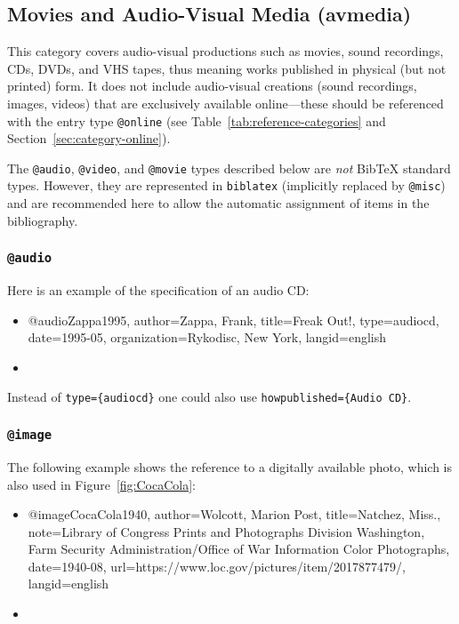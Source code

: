 \subsection{Movies and Audio-Visual Media (\textsf{avmedia})}
\label{sec:category-avmedia}

This category covers audio-visual productions such as movies, sound recordings,
CDs, DVDs, and VHS tapes, thus meaning works published in physical (but not
printed) form. It does not include audio-visual creations (sound recordings,
images, videos) that are exclusively available online---these should be
referenced with the entry type \texttt{@online} (see
Table~\ref{tab:reference-categories} and Section~\ref{sec:category-online}).

The \texttt{@audio}, \texttt{@video}, and \texttt{@movie} types described below
are \emph{not} BibTeX standard types. However, they are represented in
\texttt{biblatex} (implicitly replaced by \texttt{@misc}) and are recommended
here to allow the automatic assignment of items in the bibliography.

\subsubsection{\texttt{\bfseries @audio}}
\label{sec:@audio}
Here is an example of the specification of an audio CD:
%
\begin{itemize}
\item[]
\begin{GenericCode}[numbers=none]
@audio{Zappa1995,
  author={Zappa, Frank},
  title={Freak Out!},
  type={audiocd},
  date={1995-05},
  organization={Rykodisc, New York},
  langid={english}
}
\end{GenericCode}
\item[\cite{Zappa1995}] 
\end{itemize}
%
Instead of \verb!type={audiocd}! one could also use \verb!howpublished={Audio CD}!.

\subsubsection{\texttt{\bfseries @image}}
\label{sec:@image}

The following example shows the reference to a digitally available photo, which
is also used in Figure~\ref{fig:CocaCola}:
%
\begin{itemize}
\item[]
\begin{GenericCode}[numbers=none]
@image{CocaCola1940,
  author={Wolcott, Marion Post},
  title={Natchez, Miss.},
  note={Library of Congress Prints and Photographs Division Washington, Farm Security Administration/Office of War Information Color Photographs},
  date={1940-08},
  url={https://www.loc.gov/pictures/item/2017877479/},
  langid={english}
}
\end{GenericCode}
\item[\cite{CocaCola1940}] 
\end{itemize}

